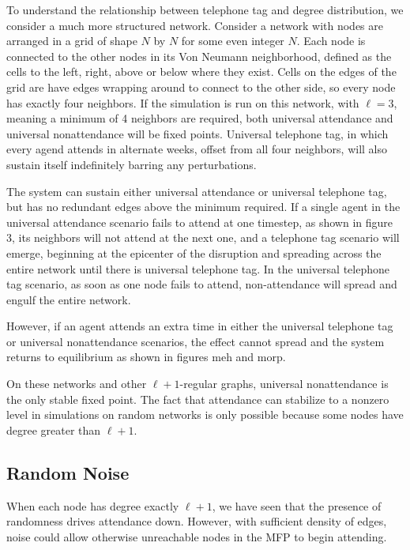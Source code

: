 \documentclass[12pt]{article}
\begin{document}
To understand the relationship between telephone tag and degree distribution, we consider a much more structured network.  Consider a network with nodes are arranged in a grid of shape $N$ by $N$ for some even integer $N$.  Each node is connected to the other nodes in its Von Neumann neighborhood, defined as the cells to the left, right, above or below where they exist.  Cells on the edges of the grid are have edges wrapping around to connect to the other side, so every node has exactly four neighbors.  If the simulation is run on this network, with $\ell = 3$, meaning a minimum of 4 neighbors are required, both universal attendance and universal nonattendance will be fixed points.  Universal telephone tag, in which every agend attends in alternate weeks, offset from all four neighbors, will also sustain itself indefinitely barring any perturbations.

The system can sustain either universal attendance or universal telephone tag, but has no redundant edges above the minimum required.  If a single agent in the universal attendance scenario fails to attend at one timestep, as shown in figure 3, its neighbors will not attend at the next one, and a telephone tag scenario will emerge, beginning at the epicenter of the disruption and spreading across the entire network until there is universal telephone tag.  In the universal telephone tag scenario, as soon as one node fails to attend, non-attendance will spread and engulf the entire network.

However, if an agent attends an extra time in either the universal telephone tag or universal nonattendance scenarios, the effect cannot spread and the system returns to equilibrium as shown in figures meh and morp.

On these networks and other $\ell + 1$-regular graphs, universal nonattendance is the only stable fixed point.  The fact that attendance can stabilize to a nonzero level in simulations on random networks is only possible because some nodes have degree greater than $\ell + 1$.

\subsection{Random Noise}

When each node has degree exactly $\ell + 1$, we have seen that the presence of randomness drives attendance down.  However, with sufficient density of edges, noise could allow otherwise unreachable nodes in the MFP to begin attending.
\end{document}
